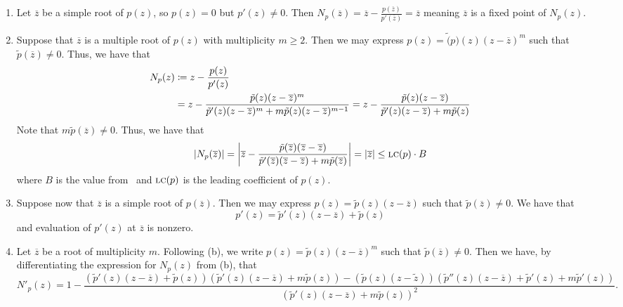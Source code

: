 \documentclass[letterpaper, 11pt, oneside]{book}
\begin{document}
\begin{sol}\label{ex:UAG_2.1.8}
  \begin{enumerate}
    \item Let $\overline{z}$ be a simple root of $p(z)$, so $p(z) = 0$ but $p'(z) \neq 0$.
          Then $N_{p}(\overline{z}) = \overline{z} - \frac{p(\overline{z})}{p'(\overline{z})} = \overline{z}$ meaning $\overline{z}$ is a fixed point of $N_{p}(z)$.
    \item Suppose that $\overline{z}$ is a multiple root of $p(z)$ with multiplicity $m \geq 2$.
          Then we may express $p(z) = \tilde(p)(z)(z - \overline{z})^{m}$ such that $\tilde{p}(\overline{z}) \neq 0$.
          Thus, we have that
          \begin{align*}
            N_{p}(z) &\coloneqq z - \frac{p(z)}{p'(z)} \\
            &= z - \frac{\tilde{p}(z)(z - \overline{z})^{m}}{\tilde{p}'(z)(z - \overline{z})^{m} + m\tilde{p}(z)(z - \overline{z})^{m - 1}} = z - \frac{\tilde{p}(z)(z - \overline{z})}{\tilde{p}'(z)(z - \overline{z}) + m\tilde{p}(z)}
          \end{align*}
          Note that $m\tilde{p}(\overline{z}) \neq 0$.
          Thus, we have that
          \[
            \abs{N_{p}(\overline{z})} = \abs{\overline{z} - \frac{\tilde{p}(\overline{z})(\overline{z} - \overline{z})}{\tilde{p}'(\overline{z})(\overline{z} - \overline{z}) + m\tilde{p}(\overline{z})}} = \abs{\overline{z}} \leq \operatorname{\textsc{lc}}(p) \cdot B
          \]
          where $B$ is the value from~ and $\operatorname{\textsc{lc}}(p)$ is the leading coefficient of $p(z)$.
    \item Suppose now that $\overline{z}$ is a simple root of $p(\overline{z})$.
          Then we may express $p(z) = \tilde{p}(z)(z - \overline{z})$ such that $\tilde{p}(\overline{z}) \neq 0$.
          We have that
          \[
            p'(z) = \tilde{p}'(z)(z - \overline{z}) + \tilde{p}(z)
          \]
          and evaluation of $p'(z)$ at $\overline{z}$ is nonzero.
    \item Let $\overline{z}$ be a root of multiplicity $m$.
          Following (b), we write $p(z) = \tilde{p}(z)(z - \overline{z})^{m}$ such that $\tilde{p}(\overline{z}) \neq 0$.
          Then we have, by differentiating the expression for $N_{p}(z)$ from (b), that
          \[
            N'_{p}(z) = 1 - \frac{(\tilde{p}'(z)(z - \overline{z}) + \tilde{p}(z))(\tilde{p}'(z)(z - \overline{z}) + m\tilde{p}(z)) - (\tilde{p}(z)(z - \tilde{z}))(\tilde{p}''(z)(z - \overline{z}) + \tilde{p}'(z) + m\tilde{p}'(z))}{(\tilde{p}'(z)(z - \overline{z}) + m\tilde{p}(z))^{2}}.
\]
\end{enumerate}
\end{sol}
\end{document}
